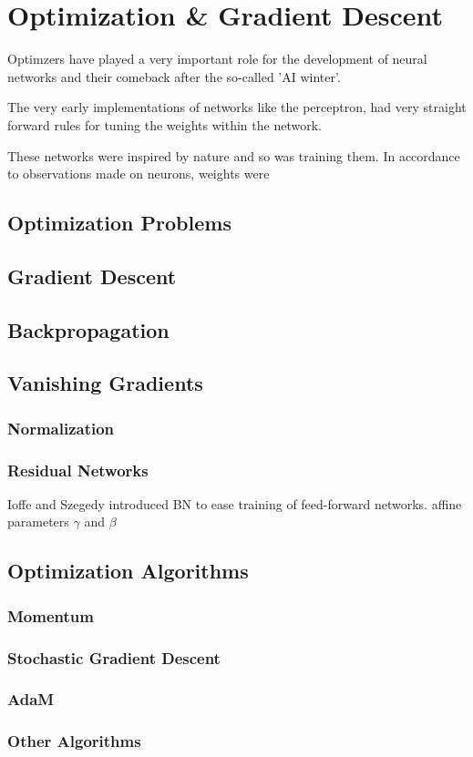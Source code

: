 \setchapterpreamble[u]{\margintoc}
\chapter{Optimization \& Gradient Descent}

Optimzers have played a very important role for the development of neural networks and their comeback after the so-called 'AI winter'.

The very early implementations of networks like the perceptron, had very straight forward rules for tuning the weights within the network.

These networks were inspired by nature and so was training them.
In accordance to observations made on neurons, weights were 

\section{Optimization Problems}


\section{Gradient Descent}

\section{Backpropagation}


\section{Vanishing Gradients}
\subsection{Normalization}
\subsection{Residual Networks}
Ioffe and Szegedy introduced BN to ease training of feed-forward networks.
affine parameters $\gamma$ and $\beta$


\section{Optimization Algorithms}
\subsection{Momentum}
\subsection{Stochastic Gradient Descent}
\subsection{AdaM}
\subsection{Other Algorithms}

